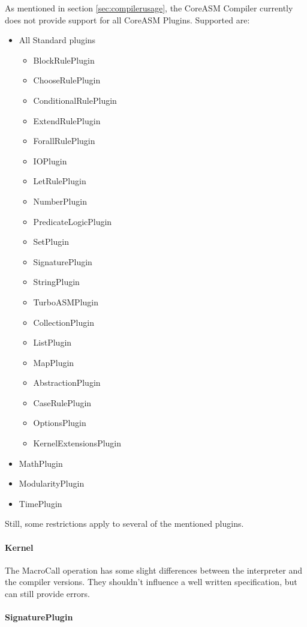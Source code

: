 \documentclass{article}
\newcommand{\CoreASM}{{\sffamily CoreASM}\xspace}
\begin{document}
As mentioned in section \ref{sec:compilerusage}, the \CoreASM Compiler currently does not provide support
for all \CoreASM Plugins. 
Supported are:
\begin{itemize}
	\item All Standard plugins
	\begin{itemize}
		\item BlockRulePlugin
		\item ChooseRulePlugin
		\item ConditionalRulePlugin
		\item ExtendRulePlugin
		\item ForallRulePlugin
		\item IOPlugin
		\item LetRulePlugin
		\item NumberPlugin
		\item PredicateLogicPlugin
		\item SetPlugin
		\item SignaturePlugin
		\item StringPlugin
		\item TurboASMPlugin
		\item CollectionPlugin
		\item ListPlugin
		\item MapPlugin
		\item AbstractionPlugin
		\item CaseRulePlugin
		\item OptionsPlugin
		\item KernelExtensionsPlugin
	\end{itemize}
	\item MathPlugin
	\item ModularityPlugin
	\item TimePlugin
\end{itemize}

Still, some restrictions apply to several of the mentioned plugins.

\paragraph{Kernel}

The MacroCall operation has some slight differences between the interpreter and the compiler versions.
They shouldn't influence a well written specification, but can still provide errors.

\paragraph{SignaturePlugin}
\end{document}
